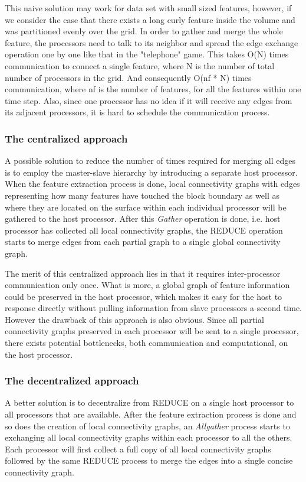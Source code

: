 \documentclass[10pt, conference, compsocconf]{IEEEtran}
\begin{document}
This naive solution may work for data set with small sized features, however, if we consider the case that there exists a long curly feature inside the volume and was partitioned evenly over the grid. In order to gather and merge the whole feature, the processors need to talk to its neighbor and spread the edge exchange operation one by one like that in the "telephone" game. This takes O(N) times communication to connect a single feature, where N is the number of total number of processors in the grid. And consequently O(nf * N) times communication, where nf is the number of features, for all the features within one time step. Also, since one processor has no idea if it will receive any edges from its adjacent processors, it is hard to schedule the communication process.

\subsubsection{The centralized approach}
A possible solution to reduce the number of times required for merging all edges is to employ the master-slave hierarchy by introducing a separate host processor. When the feature extraction process is done, local connectivity graphs with edges representing how many features have touched the block boundary as well as where they are located on the surface within each individual processor will be gathered to the host processor. After this \textit{Gather} operation is done, i.e. host processor has collected all local connectivity graphs, the REDUCE operation starts to merge edges from each partial graph to a single global connectivity graph.

The merit of this centralized approach lies in that it requires inter-processor communication only once. What is more, a global graph of feature information could be preserved in the host processor, which makes it easy for the host to response directly without pulling information from slave processors a second time. However the drawback of this approach is also obvious. Since all partial connectivity graphs preserved in each processor will be sent to a single processor, there exists potential bottlenecks, both communication and computational, on the host processor.

\subsubsection{The decentralized approach}
A better solution is to decentralize from REDUCE on a single host processor to all processors that are available. After the feature extraction process is done and so does the creation of local connectivity graphs, an \textit{Allgather} process starts to exchanging all local connectivity graphs within each processor to all the others. Each processor will first collect a full copy of all local connectivity graphs followed by the same REDUCE process to merge the edges into a single concise connectivity graph. 
\end{document}
